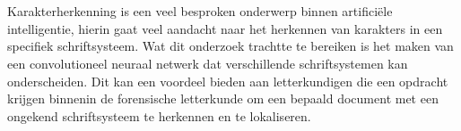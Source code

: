 
%
%

%



\chapter*{}

Karakterherkenning is een veel besproken onderwerp binnen artificiële intelligentie, hierin gaat veel aandacht naar het herkennen van karakters in een specifiek schriftsysteem.
Wat dit onderzoek trachtte te bereiken is het maken van een convolutioneel neuraal netwerk dat verschillende schriftsystemen kan onderscheiden.
Dit kan een voordeel bieden aan letterkundigen die een opdracht krijgen binnenin de forensische letterkunde om een bepaald document met een ongekend schriftsysteem te herkennen en te lokaliseren.

